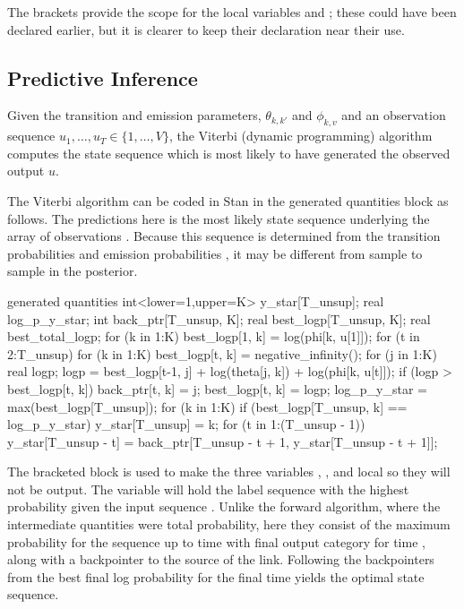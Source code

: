 The brackets provide the scope for the local variables  and
; these could have been declared earlier, but it is
clearer to keep their declaration near their use.


\subsection{Predictive Inference}

Given the transition and emission parameters, $\theta_{k, k'}$ and
$\phi_{k,v}$ and an observation sequence $u_1,\ldots,u_T \in \{
1,\ldots,V \}$, the Viterbi (dynamic programming) algorithm
computes the state sequence which is most likely to have generated the
observed output $u$.

The Viterbi algorithm can be coded in Stan in the generated quantities
block as follows.  The predictions here is the most likely state
sequence  underlying the
array of observations .  Because this
sequence is determined from the transition probabilities
 and emission probabilities , it may be
different from sample to sample in the posterior.
%
\begin{stancode}
generated quantities {
  int<lower=1,upper=K> y_star[T_unsup];
  real log_p_y_star;
  {
    int back_ptr[T_unsup, K];
    real best_logp[T_unsup, K];
    real best_total_logp;
    for (k in 1:K)
      best_logp[1, k] = log(phi[k, u[1]]);
    for (t in 2:T_unsup) {
      for (k in 1:K) {
        best_logp[t, k] = negative_infinity();
        for (j in 1:K) {
          real logp;
          logp = best_logp[t-1, j]
                  + log(theta[j, k]) + log(phi[k, u[t]]);
          if (logp > best_logp[t, k]) {
            back_ptr[t, k] = j;
            best_logp[t, k] = logp;
          }
        }
      }
    }
    log_p_y_star = max(best_logp[T_unsup]);
    for (k in 1:K)
      if (best_logp[T_unsup, k] == log_p_y_star)
        y_star[T_unsup] = k;
    for (t in 1:(T_unsup - 1))
      y_star[T_unsup - t] = back_ptr[T_unsup - t + 1,
                                      y_star[T_unsup - t + 1]];
  }
}
\end{stancode}
%
The bracketed block is used to make the three variables
, , and 
local so they will not be output.  The variable  will
hold the label sequence with the highest probability given the input
sequence .  Unlike the forward algorithm, where the
intermediate quantities were total probability, here they consist of
the maximum probability  for the sequence up to
time  with final output category  for time ,
along with a backpointer to the source of the link.  Following the
backpointers from the best final log probability for the final time
 yields the optimal state sequence.

